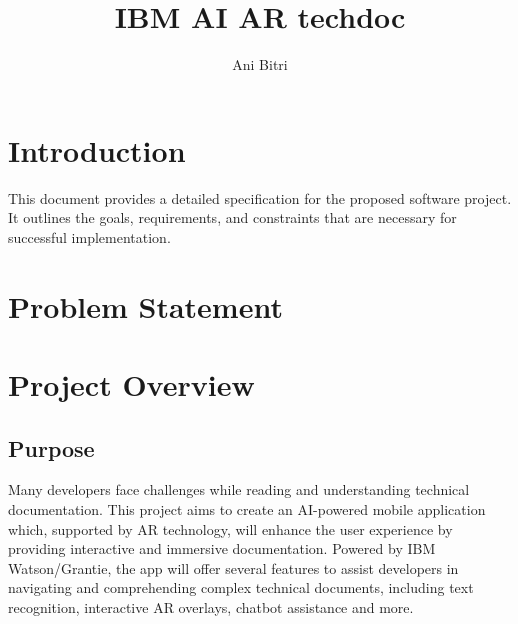 \documentclass[12pt]{article}
\title{IBM AI AR techdoc}
\author{Ani Bitri}
\begin{document}
\maketitle

\tableofcontents
\newpage

\section{Introduction}
This document provides a detailed specification for the proposed software project. It outlines the goals, requirements, and constraints that are necessary for successful implementation.

\section{Problem Statement}

\section{Project Overview}

    \subsection{Purpose}
    Many developers face challenges while reading and understanding technical documentation. This project aims to create an AI-powered mobile application which, supported by AR technology, will enhance the user experience
    by providing interactive and immersive documentation. Powered by IBM Watson/Grantie, the app will offer several features to assist developers in navigating and comprehending complex technical documents, including text recognition,
    interactive AR overlays, chatbot assistance and more.
\end{document}
